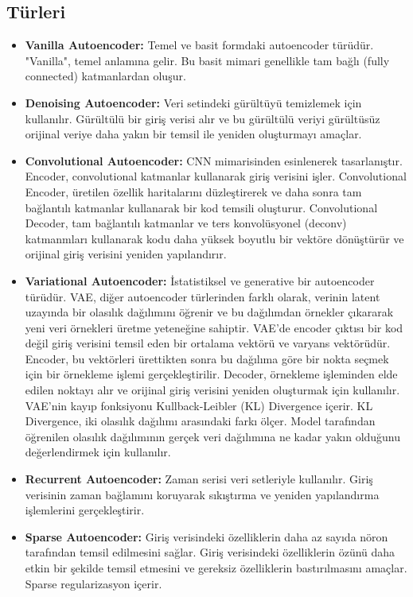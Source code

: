 \subsection{Türleri}
\begin{itemize}
    \item \textbf{Vanilla Autoencoder:} Temel ve basit formdaki autoencoder türüdür. "Vanilla", temel anlamına gelir. Bu basit mimari genellikle tam bağlı (fully connected) katmanlardan oluşur.
    \item \textbf{Denoising Autoencoder:} Veri setindeki gürültüyü temizlemek için kullanılır. Gürültülü bir giriş verisi alır ve bu gürültülü veriyi gürültüsüz orijinal veriye daha yakın bir temsil ile yeniden oluşturmayı amaçlar. 
    \item \textbf{Convolutional Autoencoder:} CNN mimarisinden esinlenerek tasarlanıştır. Encoder, convolutional katmanlar kullanarak giriş verisini işler. Convolutional Encoder, üretilen özellik haritalarını düzleştirerek ve daha sonra tam bağlantılı katmanlar kullanarak bir kod temsili oluşturur. Convolutional Decoder, tam bağlantılı katmanlar ve ters konvolüsyonel (deconv) katmanmları kullanarak kodu daha yüksek boyutlu bir vektöre dönüştürür ve orijinal giriş verisini yeniden yapılandırır.
    \item \textbf{Variational Autoencoder:} İstatistiksel ve generative bir autoencoder türüdür. VAE, diğer autoencoder türlerinden farklı olarak, verinin latent uzayında bir olasılık dağılımını öğrenir ve bu dağılımdan örnekler çıkararak yeni veri örnekleri üretme yeteneğine sahiptir. VAE'de encoder çıktısı bir kod değil giriş verisini temsil eden bir ortalama vektörü ve varyans vektörüdür. Encoder, bu vektörleri ürettikten sonra bu dağılıma göre bir nokta seçmek için bir örnekleme işlemi gerçekleştirilir. Decoder, örnekleme işleminden elde edilen noktayı alır ve orijinal giriş verisini yeniden oluşturmak için kullanılır. VAE'nin kayıp fonksiyonu Kullback-Leibler (KL) Divergence içerir. KL Divergence, iki olasılık dağılımı arasındaki farkı ölçer. Model tarafından öğrenilen olasılık dağılımının gerçek veri dağılımına ne kadar yakın olduğunu değerlendirmek için kullanılır.
    \item \textbf{Recurrent Autoencoder:} Zaman serisi veri setleriyle kullanılır. Giriş verisinin zaman bağlamını koruyarak sıkıştırma ve yeniden yapılandırma işlemlerini gerçekleştirir. 
    \item \textbf{Sparse Autoencoder:} Giriş verisindeki özelliklerin daha az sayıda nöron tarafından temsil edilmesini sağlar. Giriş verisindeki özelliklerin özünü daha etkin bir şekilde temsil etmesini ve gereksiz özelliklerin bastırılmasını amaçlar. Sparse regularizasyon içerir.

\end{itemize}
